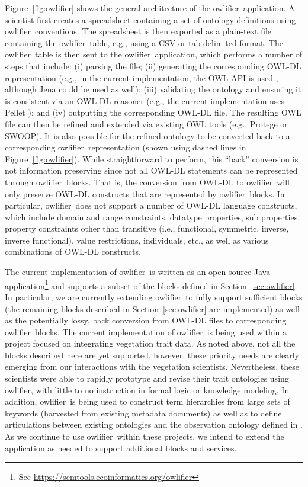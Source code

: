 \documentclass[5p,authoryear]{elsarticle}
\newcommand{\owlifier}{\textsf{owlifier}}
\newcommand{\secref}[1]{Section~\ref{#1}}
\newcommand{\figref}[1]{Figure~\ref{#1}}
\begin{document}
\figref{fig:owlifier} shows the general architecture of the \owlifier\ application. A scientist first creates a spreadsheet containing a set of ontology definitions using \owlifier\ conventions.  The spreadsheet is then exported as a plain-text file containing the \owlifier\ table, e.g., using a CSV or tab-delimited format. The \owlifier\ table is then sent to the \owlifier\ application, which performs a number of steps that include: (i) parsing the file; (ii) generating the corresponding OWL-DL representation (e.g., in the current implementation, the OWL-API is used \citep{horridge07:_ignit_owl}, although Jena \citep{carroll04:_jena} could be used as well); (iii) validating the ontology and ensuring it is consistent via an OWL-DL reasoner (e.g., the current implementation uses Pellet \citep{sirin07:_pellet}); and (iv) outputting the corresponding OWL-DL file. The resulting OWL file can then be refined and extended via existing OWL tools (e.g., Protege or SWOOP). It is also possible for the refined ontology to be converted back to a corresponding \owlifier\ representation (shown using dashed lines in \figref{fig:owlifier}). While straightforward to perform, this ``back'' conversion is not information preserving since not all OWL-DL statements can be represented through \owlifier\ blocks.  That is, the conversion from OWL-DL to \owlifier\ will only preserve OWL-DL constructs that are represented by \owlifier\ blocks.  In particular, \owlifier\ does not support a number of OWL-DL language constructs, which include domain and range constraints, datatype properties, sub properties, property constraints other than transitive (i.e., functional, symmetric, inverse, inverse functional), value restrictions, individuals, etc., as well as various combinations of OWL-DL constructs.

The current implementation of \owlifier\ is written as an open-source Java application\footnote{See \url{https://semtools.ecoinformatics.org/owlifier}} and supports a subset of the blocks defined in \secref{sec:owlifier}. In particular, we are currently extending \owlifier\ to fully support sufficient blocks (the remaining blocks described in \secref{sec:owlifier} are implemented) as well as the potentially lossy, back conversion from OWL-DL files to corresponding \owlifier\ blocks. The current implementation of \owlifier\ is being used within a project focused on integrating vegetation trait data.  As noted above, not all the blocks described here are yet supported, however, these priority needs are clearly emerging from our interactions with the vegetation scientists.  Nevertheless, these scientists were able to rapidly prototype and revise their trait ontologies using \owlifier, with little to no instruction in formal logic or knowledge modeling.  In addition, \owlifier\ is being used to construct term hierarchies from large sets of keywords (harvested from existing metadata documents) as well as to define articulations between existing ontologies and the observation ontology defined in \citep{madin07:_ontol_for_descr_and_synth}. As we continue to use \owlifier\ within these projects, we intend to extend the application as needed to support additional blocks and services.
\end{document}
